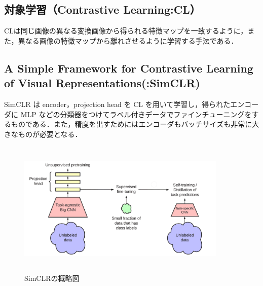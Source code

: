 \documentclass[twocolumn]{jarticle}     %
\begin{document}
\subsection{対象学習（Contrastive Learning:CL）}
CLは同じ画像の異なる変換画像から得られる特徴マップを一致するように，また，異なる画像の特徴マップから離れさせるように学習する手法である．

\subsection{A Simple Framework for Contrastive Learning of Visual Representations(:SimCLR)}
SimCLR は encoder，projection head を CL を用いて学習し，得られたエンコーダに MLP などの分類器をつけてラベル付きデータでファインチューニングをするものである．また，精度を出すためにはエンコーダもバッチサイズも非常に大きなものが必要となる．

\begin{figure}[h]
	\begin{center}
		\vspace*{-3mm}
		\hspace*{-12mm}
		\includegraphics[height=65mm,width=100mm]{キャプチャ.PNG}
		\caption{SimCLRの概略図\label{fig:}}
	\end{center}
\end{figure}
\end{document}
